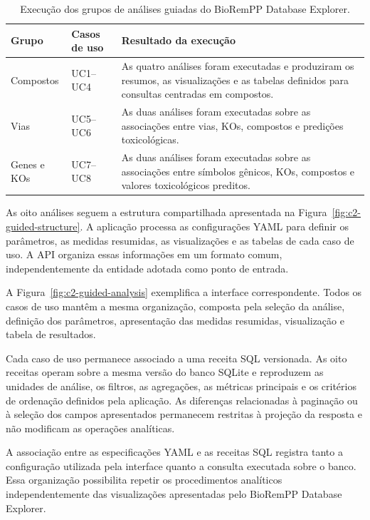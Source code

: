 \begin{table}[htbp]
\centering
\caption{Execução dos grupos de análises guiadas do BioRemPP Database
Explorer.}
\label{tab:c2-guided-execution}
\small
\begin{tabularx}{\textwidth}{@{}p{3.1cm}p{2.5cm}X@{}}
\toprule
\textbf{Grupo}
& \textbf{Casos de uso}
& \textbf{Resultado da execução} \\
\midrule

Compostos
& UC1--UC4
& As quatro análises foram executadas e produziram os resumos, as
visualizações e as tabelas definidos para consultas centradas em compostos. \\

Vias
& UC5--UC6
& As duas análises foram executadas sobre as associações entre vias, KOs,
compostos e predições toxicológicas. \\

Genes e KOs
& UC7--UC8
& As duas análises foram executadas sobre as associações entre símbolos
gênicos, KOs, compostos e valores toxicológicos preditos. \\

\bottomrule
\end{tabularx}
\end{table}

As oito análises seguem a estrutura compartilhada apresentada na
Figura~\ref{fig:c2-guided-structure}. A aplicação processa as configurações
YAML para definir os parâmetros, as medidas resumidas, as visualizações e as
tabelas de cada caso de uso. A API organiza essas informações em um formato
comum, independentemente da entidade adotada como ponto de entrada.

A Figura~\ref{fig:c2-guided-analysis} exemplifica a interface correspondente.
Todos os casos de uso mantêm a mesma organização, composta pela seleção da
análise, definição dos parâmetros, apresentação das medidas resumidas,
visualização e tabela de resultados.

Cada caso de uso permanece associado a uma receita SQL versionada. As oito
receitas operam sobre a mesma versão do banco SQLite e reproduzem as unidades
de análise, os filtros, as agregações, as métricas principais e os critérios de
ordenação definidos pela aplicação. As diferenças relacionadas à paginação ou
à seleção dos campos apresentados permanecem restritas à projeção da resposta e
não modificam as operações analíticas.

A associação entre as especificações YAML e as receitas SQL registra tanto a
configuração utilizada pela interface quanto a consulta executada sobre o
banco. Essa organização possibilita repetir os procedimentos analíticos
independentemente das visualizações apresentadas pelo BioRemPP Database
Explorer.

